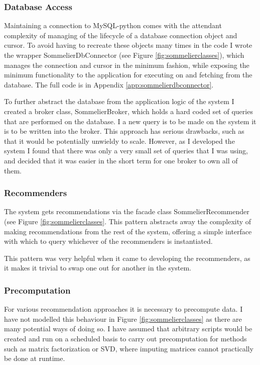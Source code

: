 \subsubsection{Database Access}

Maintaining a connection to MySQL-python comes with the attendant complexity of managing of the lifecycle of a database connection object and cursor. To avoid having to recreate these objects many times in the code I wrote the wrapper SommelierDbConnector (see Figure \ref{fig:sommelierclasses}), which manages the connection and cursor in the minimum fashion, while exposing the minimum functionality to the application for executing on and fetching from the database. The full code is in Appendix \ref{app:sommelierdbconnector}.

To further abstract the database from the application logic of the system I created a broker class, SommelierBroker, which holds a hard coded set of queries that are performed on the database. I a new query is to be made on the system it is to be written into the broker. This approach has serious drawbacks, such as that it would be potentially unwieldy to scale. However, as I developed the system I found that there was only a very small set of queries that I was using, and decided that it was easier in the short term for one broker to own all of them.

\subsubsection{Recommenders}

The system gets recommendations via the facade class SommelierRecommender (see Figure \ref{fig:sommelierclasses}. This pattern abstracts away the complexity of making recommendations from the rest of the system, offering a simple interface with which to query whichever of the recommenders is instantiated. 

This pattern was very helpful when it came to developing the recommenders, as it makes it trivial to swap one out for another in the system.

\subsubsection{Precomputation}

For various recommendation approaches it is necessary to precompute data. I have not modelled this behaviour in Figure \ref{fig:sommelierclasses} as there are many potential ways of doing so. I have assumed that arbitrary scripts would be created and run on a scheduled basis to carry out precomputation for methods such as matrix factorization or SVD, where imputing matrices cannot practically be done at runtime.

